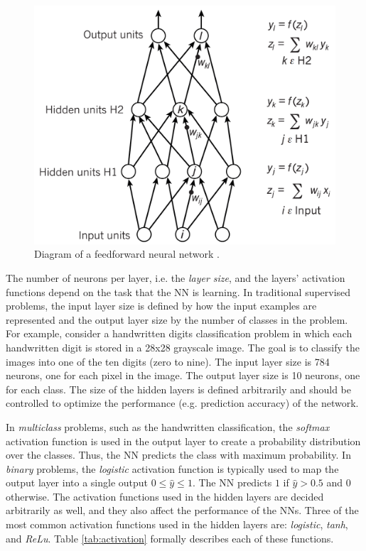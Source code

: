 \begin{figure}[!h]
\centering
\includegraphics[width=0.7\columnwidth]{imgs/background/ann.png}
\caption{Diagram of a feedforward neural network \cite{lecun2015deep}.}
\label{fig:nn}
\end{figure}

The number of neurons per layer, i.e. the \textit{layer size}, and the layers' activation functions depend on the task that the NN is learning. In traditional supervised problems, the input layer size is defined by how the input examples are represented and the output layer size by the number of classes in the problem. For example, consider a handwritten digits classification problem in which each handwritten digit is stored in a 28x28 grayscale image. The goal is to classify the images into one of the ten digits (zero to nine). The input layer size is 784 neurons, one for each pixel in the image. The output layer size is 10 neurons, one for each class. The size of the hidden layers is defined arbitrarily and should be controlled to optimize the performance (e.g. prediction accuracy) of the network.

In \textit{multiclass} problems, such as the handwritten classification, the \textit{softmax} activation function is used in the output layer to create a probability distribution over the classes. Thus, the NN predicts the class with maximum probability. In \textit{binary} problems, the \textit{logistic} activation function is typically used to map the output layer into a single output $0 \leq \hat{y} \leq 1$. The NN predicts $1$ if $\hat{y} > 0.5$ and $0$ otherwise. The activation functions used in the hidden layers are decided arbitrarily as well, and they also affect the performance of the NNs. Three of the most common activation functions used in the hidden layers are: \textit{logistic}, \textit{tanh}, and \textit{ReLu}. Table \ref{tab:activation} formally describes each of these functions.

